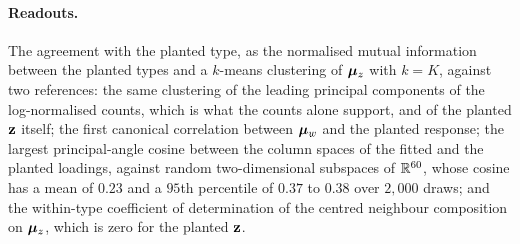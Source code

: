 \paragraph{Readouts.} The agreement with the planted type, as the normalised mutual information between the planted types and a $k$-means clustering of $\boldsymbol{\mu}_z$ with $k = K$, against two references: the same clustering of the leading principal components of the log-normalised counts, which is what the counts alone support, and of the planted $\mathbf{z}$ itself; the first canonical correlation between $\boldsymbol{\mu}_w$ and the planted response; the largest principal-angle cosine between the column spaces of the fitted and the planted loadings, against random two-dimensional subspaces of $\mathbb{R}^{60}$, whose cosine has a mean of $0.23$ and a $95$th percentile of $0.37$ to $0.38$ over $2{,}000$ draws; and the within-type coefficient of determination of the centred neighbour composition on $\boldsymbol{\mu}_z$, which is zero for the planted $\mathbf{z}$.

